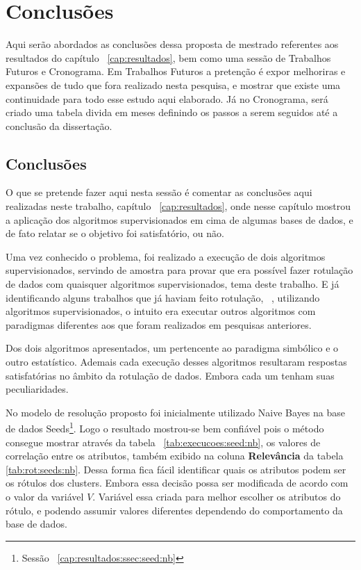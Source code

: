 \chapter*{Conclusões}\label{cap:conclusao} 
Aqui serão abordados as conclusões dessa  proposta de mestrado referentes aos resultados do capítulo ~\ref{cap:resultados},  bem como uma sessão de Trabalhos Futuros e  Cronograma. Em Trabalhos Futuros a pretenção é expor melhoriras e expansões de tudo que fora realizado  nesta pesquisa, e mostrar que existe uma continuidade para todo esse estudo aqui elaborado. Já no Cronograma, será criado uma tabela divida em meses definindo os passos a serem seguidos até a conclusão da dissertação.

\section*{Conclusões}

O que se pretende fazer aqui nesta sessão é comentar as conclusões aqui realizadas neste trabalho, capítulo ~\ref{cap:resultados}, onde nesse capítulo mostrou a aplicação dos algoritmos supervisionados em cima de algumas bases de dados, e de fato relatar se o objetivo foi satisfatório, ou não.

Uma vez conhecido o problema, foi realizado a execução de dois algoritmos supervisionados, servindo de amostra para provar que era possível fazer rotulação de dados com quaisquer algoritmos supervisionados, tema deste trabalho. E já identificando alguns trabalhos que já haviam feito rotulação, ~\cite{Lopes}, utilizando algoritmos supervisionados, o intuito era executar outros algoritmos com paradigmas diferentes aos que foram realizados em pesquisas anteriores. 

Dos dois algoritmos apresentados, um pertencente ao paradigma simbólico e o outro estatístico. Ademais cada execução desses algoritmos resultaram respostas satisfatórias no âmbito da rotulação de dados. Embora cada um tenham suas peculiaridades.

No modelo de resolução proposto foi inicialmente utilizado Naive Bayes na base de dados Seeds\footnote{Sessão ~\ref{cap:resultados:ssec:seed:nb}}. Logo o resultado mostrou-se bem confiável pois o método consegue mostrar através da tabela ~\ref{tab:execucoes:seed:nb}, os valores de correlação entre os atributos, também exibido na coluna \textbf{Relevância} da tabela \ref{tab:rot:seeds:nb}. Dessa forma fica fácil identificar quais os atributos podem ser os rótulos dos clusters. Embora essa decisão possa ser modificada de acordo com o valor da variável ${V}$. Variável essa criada para melhor escolher os atributos do rótulo, e podendo assumir valores diferentes dependendo do comportamento da base de dados.

